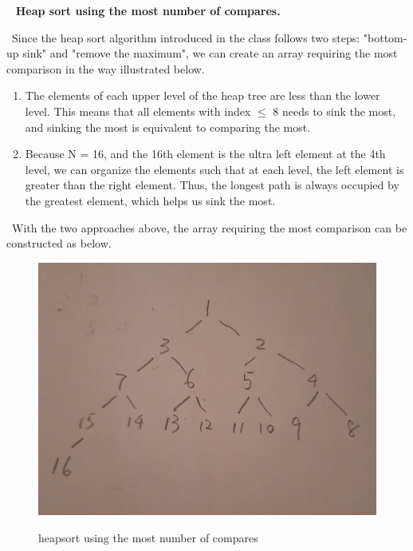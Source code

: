 \documentclass[11pt]{article}
\begin{document}
~\newline\noindent 
\textbf{Heap sort using the most number of compares.}

~\newline\noindent Since the heap sort algorithm introduced in the class follows two steps: "bottom-up sink" and "remove the maximum", we can create an array requiring the most comparison in the way illustrated below.

\begin{enumerate}
\item The elements of each upper level of the heap tree are less than the lower level. This means that all elements with index $\le$ 8 needs to sink the most, and sinking the most is equivalent to comparing the most.

\item Because N = 16, and the 16th element is the ultra left element at the 4th level, we can organize the elements such that at each level, the left element is greater than the right element. Thus, the longest path is always occupied by the greatest element, which helps us sink the most.
\end{enumerate}

~\newline\noindent With the two approaches above, the array requiring the most comparison can be constructed as below.
 \begin{figure}[hbt!]
  \centering
    \includegraphics[width=1\textwidth]{Figures/heap.jpg}\label{heap}
  \caption{heapsort using the most number of compares}
\end{figure}
\newpage
\end{document}

